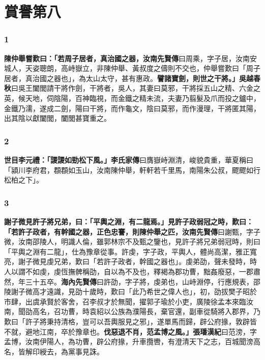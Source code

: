 \chapter{賞譽第八}

\subsection*{1}

\textbf{陳仲舉嘗歎曰：「若周子居者，真治國之器，}{\footnotesize \textbf{汝南先賢傳}曰周乘，字子居，汝南安城人，天姿聰朗，高峙嶽立，非陳仲舉、黃叔度之儔則不交也，仲舉嘗歎曰「周子居者，真治國之器也」，為太山太守，甚有惠政。}\textbf{譬諸寶劍，則世之干將。」}{\footnotesize \textbf{吳越春秋}曰吳王闔閭請干將作劍，干將者，吳人，其妻曰莫邪，干將採五山之精、六金之英，候天地，伺陰陽，百神臨視，而金鐵之精未流，夫妻乃翦髮及爪而投之鑪中，金鐵乃濡，遂成二劍，陽曰干將，而作龜文，陰曰莫邪，而作漫理，干將匿其陽，出其陰以獻闔閭，闔閭甚寶重之。}

\subsection*{2}

\textbf{世目李元禮：「謖謖如勁松下風。」}{\footnotesize \textbf{李氏家傳}曰膺嶽峙淵清，峻貌貴重，華夏稱曰「潁川李府君，頵頵如玉山，汝南陳仲舉，軒軒若千里馬，南陽朱公叔，飂飂如行松柏之下」。}

\subsection*{3}

\textbf{謝子微見許子將兄弟，曰：「平輿之淵，有二龍焉。」見許子政弱冠之時，歎曰：「若許子政者，有幹國之器，正色忠謇，則陳仲舉之匹，}{\footnotesize \textbf{汝南先賢傳}曰謝甄，字子微，汝南邵陵人，明識人倫，雖郭林宗不及甄之鑒也，見許子將兄弟弱冠時，則曰「平輿之淵有二龍」，仕為豫章從事。許虔，字子政，平輿人，體尚高潔，雅正寬亮，謝子微見虔兄弟，歎曰「若許子政者，幹國之器也」。虔弟劭，聲未發時，時人以謂不如虔，虔恆撫髀稱劭，自以為不及也，釋褐為郡功曹，黜姦廢惡，一郡肅然，年三十五卒。\textbf{海內先賢傳}曰許劭，字子將，虔弟也，山峙淵停，行應規表，邵陵謝子微高才遠識，見劭十歲時，歎曰「此乃希世之偉人也」，初，劭拔樊子昭於市肆，出虞承賢於客舍，召李叔才於無聞，擢郭子瑜於小吏，廣陵徐孟本來臨汝南，聞劭高名，召功曹，時袁紹以公族為濮陽長，棄官還，副車從騎將入郡界，乃歎曰「許子將秉持清格，豈可以吾輿服見之邪」，遂單馬而歸，辟公府掾，敦辟皆不就，避地江南，卒於豫章也。}\textbf{伐惡退不肖，范孟博之風。」}{\footnotesize \textbf{張璠漢紀}曰范滂，字孟博，汝南伊陽人，為功曹，辟公府掾，升車攬轡，有澄清天下之志，百城聞滂高名，皆解印綬去，為黨事見誅。}

